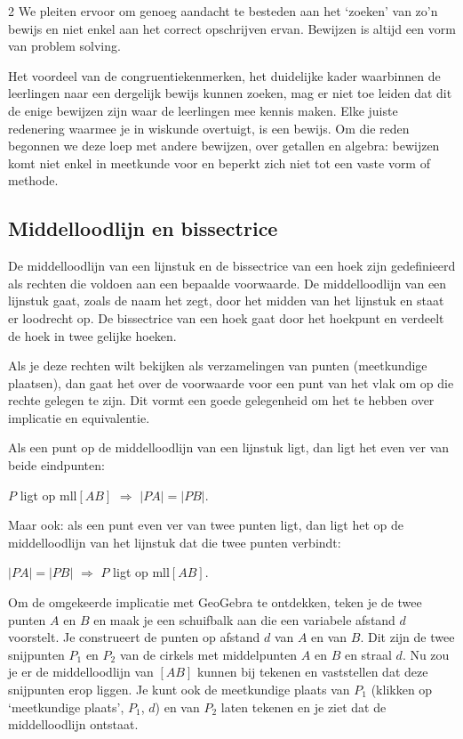 \begin{multicols}{2}
We pleiten ervoor om genoeg aandacht te besteden aan het `zoeken' van zo'n bewijs en niet enkel aan het correct opschrijven ervan. Bewijzen is altijd een vorm van problem solving.

Het voordeel van de congruentiekenmerken, het duidelijke kader waarbinnen de leerlingen naar een dergelijk bewijs kunnen zoeken, mag er niet toe leiden dat dit de enige bewijzen zijn waar de leerlingen mee kennis maken. Elke juiste redenering waarmee je in wiskunde overtuigt, is een bewijs. Om die reden begonnen we deze loep met andere bewijzen, over getallen en algebra: bewijzen komt niet enkel in meetkunde voor en beperkt zich niet tot een vaste vorm of methode.

\subsection{Middelloodlijn en bissectrice}


De middelloodlijn van een lijnstuk en de bissectrice van een hoek zijn gedefinieerd als rechten die voldoen aan een bepaalde voorwaarde. De middelloodlijn van een lijnstuk gaat, zoals de naam het zegt, door het midden van het lijnstuk en staat er loodrecht op. De bissectrice van een hoek gaat door het hoekpunt en verdeelt de hoek in twee gelijke hoeken.

Als je deze rechten wilt bekijken als verzamelingen van punten (meetkundige plaatsen), dan gaat het over de voorwaarde voor een punt van het vlak om op die rechte gelegen te zijn. Dit vormt een goede gelegenheid om het te hebben over implicatie en equivalentie.

Als een punt op de middelloodlijn van een lijnstuk ligt, dan ligt het even ver van beide eindpunten:
\begin{center}
$P$ ligt op mll$[AB]$ $\Rightarrow$ $|PA|=|PB|$.
\end{center}
Maar ook: als een punt even ver van twee punten ligt, dan ligt het op de middelloodlijn van het lijnstuk dat die twee punten verbindt:
\begin{center}
$|PA|=|PB|$ $\Rightarrow$ $P$ ligt op mll$[AB]$. 
\end{center}

Om de omgekeerde implicatie met GeoGebra te ontdekken, teken je de twee punten $A$ en $B$ en maak je een schuifbalk aan die een variabele afstand $d$ voorstelt. Je construeert de punten op afstand $d$ van $A$ en van $B$. Dit zijn de twee snijpunten $P_1$ en $P_2$ van de cirkels met middelpunten $A$ en $B$ en straal $d$. Nu zou je er de middelloodlijn van $[AB]$ kunnen bij tekenen en vaststellen dat deze snijpunten erop liggen. Je kunt ook de meetkundige plaats van $P_1$ (klikken op `meetkundige plaats’, $P_1$, $d$) en van $P_2$ laten tekenen en je ziet dat de middelloodlijn ontstaat.


\end{multicols}
